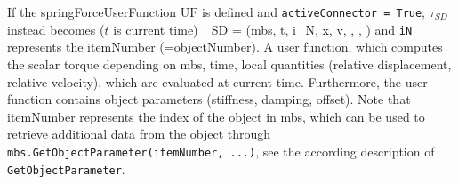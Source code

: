     If the springForceUserFunction $\mathrm{UF}$ is defined and \texttt{activeConnector = True}, 
    $\tau_{SD}$ instead becomes ($t$ is current time)
    \be
      \tau_{SD} = (mbs, t, i_N, \Delta x, \Delta v, , , )
    \ee
    and \texttt{iN} represents the itemNumber (=objectNumber).
    A user function, which computes the scalar torque depending on mbs, time, local quantities 
    (relative displacement, relative velocity), which are evaluated at current time. 
    Furthermore, the user function contains object parameters (stiffness, damping, offset).
    Note that itemNumber represents the index of the object in mbs, which can be used to retrieve additional data from the object through
    \texttt{mbs.GetObjectParameter(itemNumber, ...)}, see the according description of \texttt{GetObjectParameter}.
    
